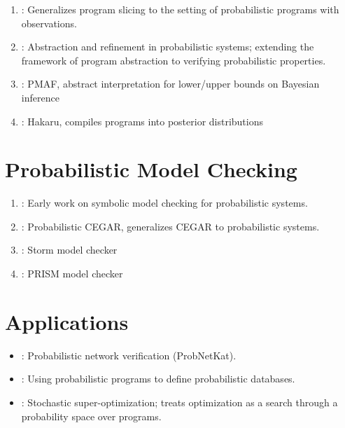 \documentclass{article}
\begin{document}
\begin{enumerate}
\item \citep{Hur2014}: Generalizes program slicing to the setting of
  probabilistic programs with observations.
\item \citep{McIver2005}: Abstraction and refinement in probabilistic systems;
  extending the framework of program abstraction to verifying probabilistic
  properties.
\item \citep{wang2018pmaf}: PMAF, abstract interpretation for lower/upper bounds
  on Bayesian inference
\item \citep{narayanan2016probabilistic}: Hakaru, compiles programs into
  posterior distributions
\end{enumerate}


\section{Probabilistic Model Checking}

\begin{enumerate}
\item \citep{Baier1997}: Early work on symbolic model checking for probabilistic
  systems.
\item \citep{Hermanns2008}: Probabilistic CEGAR, generalizes CEGAR to
  probabilistic systems.
\item \citep{Dehnert2017ASI}: Storm model checker
\item \citep{kwiatkowska2002prism}: PRISM model checker
\end{enumerate}

\section{Applications}
\begin{itemize}
\item \citep{Foster2016}: Probabilistic network verification (ProbNetKat).
\item \citep{Gordon2014}: Using probabilistic programs to define probabilistic
  databases.
\item \citep{Schkufza2013}: Stochastic super-optimization; treats optimization as
  a search through a probability space over programs.

\end{itemize}




\end{document}
